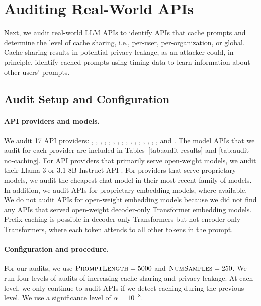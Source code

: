 




\section{Auditing Real-World APIs}

Next, we audit real-world LLM APIs to identify APIs that cache prompts and determine the level of cache sharing, i.e., per-user, per-organization, or global. Cache sharing results in potential privacy leakage, as an attacker could, in principle, identify cached prompts using timing data to learn information about other users' prompts.


\subsection{Audit Setup and Configuration}
\label{sec:audit-setup}

\paragraph{API providers and models.}
We audit 17 API providers: \Anthropic{}, \AmazonBedrock{}, \MicrosoftAzure{}, \Cohere{}, \DeepInfra{}, \DeepSeek{}, \FireworksAI{}, \Google{}, \Groq{}, \Hyperbolic{}, \LeptonAI{}, \Mistral{}, \OctoAI{}, \OpenAI{}, \Perplexity{}, \Replicate{}, and \TogetherAI{}. The model APIs that we audit for each provider are included in Tables~\ref{tab:audit-results} and \ref{tab:audit-no-caching}. For API providers that primarily serve open-weight models, we audit their Llama 3 or 3.1 8B Instruct API \citep{dubey2024llama}. For providers that serve proprietary models, we audit the cheapest chat model in their most recent family of models. In addition, we audit APIs for proprietary embedding models, where available. We do not audit APIs for open-weight embedding models because we did not find any APIs that served open-weight decoder-only Transformer embedding models. Prefix caching is possible in decoder-only Transformers but not encoder-only Transformers, where each token attends to all other tokens in the prompt.



\paragraph{Configuration and procedure.}
For our audits, we use $\textsc{PromptLength}{} = 5000$ and $\textsc{NumSamples}{} = 250$. We run four levels of audits of increasing cache sharing and privacy leakage. At each level, we only continue to audit APIs if we detect caching during the previous level. We use a significance level of $\alpha = 10^{-8}$.

